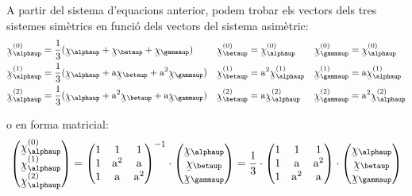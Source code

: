 A partir del sistema d'equacions anterior, podem trobar els vectors
dels tres sistemes sim\`{e}trics en funci\'{o} dels vectors del sistema
asim\`{e}tric:
\begin{subequations}
\begin{align}
   \cmplx{\chi}_\alphaup\ap{(0)} &= \frac{1}{3} (\cmplx{\chi}_\alphaup + \cmplx{\chi}_\betaup +
   \cmplx{\chi}_\gammaup) & \cmplx{\chi}_\betaup\ap{(0)} &= \cmplx{\chi}_\alphaup\ap{(0)} &
   \cmplx{\chi}_\gammaup\ap{(0)} &= \cmplx{\chi}_\alphaup\ap{(0)}
   \label{eq:c_sim_c2}\\
   \cmplx{\chi}_\alphaup\ap{(1)} &= \frac{1}{3} (\cmplx{\chi}_\alphaup + \au \cmplx{\chi}_\betaup +
   \au^2 \cmplx{\chi}_\gammaup) & \cmplx{\chi}_\betaup\ap{(1)} &= \au^2 \cmplx{\chi}_\alphaup\ap{(1)} &
   \cmplx{\chi}_\gammaup\ap{(1)} &= \au \cmplx{\chi}_\alphaup\ap{(1)} \label{eq:c_sim_a2} \\
   \cmplx{\chi}_\alphaup\ap{(2)} &= \frac{1}{3} (\cmplx{\chi}_\alphaup + \au^2 \cmplx{\chi}_\betaup +
   \au \cmplx{\chi}_\gammaup) & \cmplx{\chi}_\betaup\ap{(2)} &= \au \cmplx{\chi}_\alphaup\ap{(2)} &
   \cmplx{\chi}_\gammaup\ap{(2)} &= \au^2 \cmplx{\chi}_\alphaup\ap{(2)} \label{eq:c_sim_b2}
\end{align}
\end{subequations}

o en forma matricial:
\begin{equation}
   \begin{pmatrix}
     \cmplx{\chi}_\alphaup\ap{(0)} \\
     \cmplx{\chi}_\alphaup\ap{(1)} \\
     \cmplx{\chi}_\alphaup\ap{(2)}
   \end{pmatrix} =
   \begin{pmatrix}
     1 & 1 & 1 \\
     1 & \au^2 & \au\\
     1 & \au & \au^2
   \end{pmatrix}^{-1} \cdot
   \begin{pmatrix}
     \cmplx{\chi}_\alphaup \\
     \cmplx{\chi}_\betaup \\
     \cmplx{\chi}_\gammaup
   \end{pmatrix} =  \frac{1}{3} \cdot
   \begin{pmatrix}
     1 & 1 & 1 \\
     1 & \au & \au^2 \\
     1 & \au^2 & \au
   \end{pmatrix} \cdot
   \begin{pmatrix}
     \cmplx{\chi}_\alphaup \\
     \cmplx{\chi}_\betaup \\
     \cmplx{\chi}_\gammaup
   \end{pmatrix}
\end{equation}

